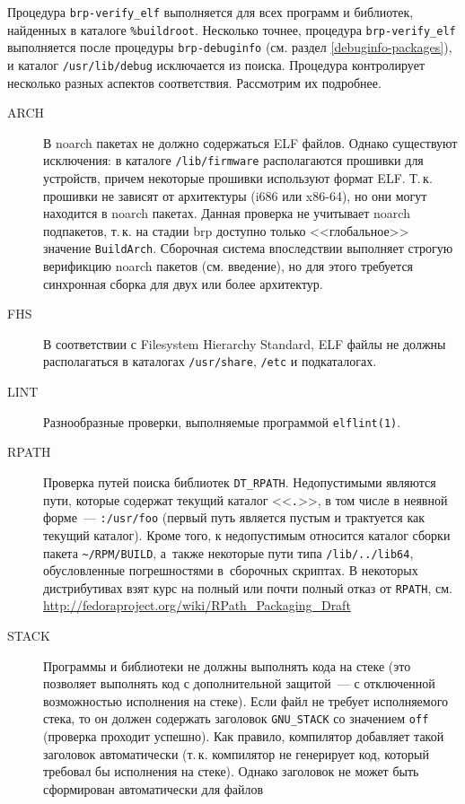 \documentclass[russian,a4paper,12pt,titlepage]{article}
\begin{document}
Процедура \verb|brp-verify_elf| выполняется для всех программ и библиотек, найденных в каталоге \verb|%buildroot|.
Несколько точнее, процедура \verb|brp-verify_elf| выполняется после процедуры \verb|brp-debuginfo| (см. раздел
\ref{debuginfo-packages}), и каталог \verb|/usr/lib/debug| исключается из поиска.  Процедура контролирует несколько
разных аспектов соответствия.  Рассмотрим их подробнее.

\begin{description}
\item[ARCH] В noarch пакетах не должно содержаться ELF файлов.  Однако существуют исключения: в каталоге \verb|/lib/firmware|
располагаются прошивки для устройств, причем некоторые прошивки используют формат ELF.  Т.\,к. прошивки не зависят от архитектуры
(i686 или x86-64), но они могут находится в noarch пакетах.  Данная проверка не учитывает noarch подпакетов, т.\,к. на стадии
brp доступно только <<глобальное>> значение \verb|BuildArch|.  Сборочная система впоследствии выполняет строгую верификцию
noarch пакетов (см. введение), но для этого требуется синхронная сборка для двух или более архитектур.
\item[FHS] В соответствии с Filesystem Hierarchy Standard, ELF файлы не должны располагаться в каталогах \verb|/usr/share|,
\verb|/etc| и подкаталогах.
\item[LINT] Разнообразные проверки, выполняемые программой \verb|elflint(1)|.
\item[RPATH] Проверка путей поиска библиотек \verb|DT_RPATH|.  Недопустимыми являются пути, которые содержат текущий каталог <<\verb|.|>>,
в том числе в неявной форме~--- \verb|:/usr/foo| (первый путь является пустым и трактуется как текущий каталог).
Кроме того, к недопустимым относится каталог сборки пакета \verb|~/RPM/BUILD|, а~также некоторые пути типа \verb|/lib/../lib64|,
обусловленные погрешностями в~сборочных скриптах.  В некоторых дистрибутивах взят курс на полный или почти полный отказ от \verb|RPATH|,
см. \url{http://fedoraproject.org/wiki/RPath_Packaging_Draft}
\item[STACK] Программы и библиотеки не должны выполнять кода на стеке (это позволяет выполнять код с дополнительной защитой~---
с отключенной возможностью исполнения на стеке).  Если файл не требует исполняемого стека, то он должен содержать заголовок \verb|GNU_STACK|
со значением \verb|off| (проверка проходит успешно).  Как правило, компилятор добавляет такой заголовок автоматически (т.\,к. компилятор
не генерирует код, который требовал бы исполнения на стеке).  Однако заголовок не может быть сформирован автоматически для файлов

\end{description}
\end{document}

